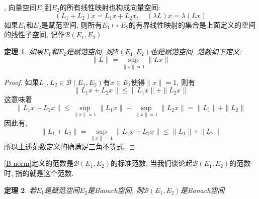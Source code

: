 \documentclass[a4paper,11pt]{book}
\newtheorem{theorem}{\hspace{2em}定理}[section]
\newtheorem{proof}{证明}[section]
\begin{document}
, 向量空间$E_1$到$E_2$的所有线性映射也构成向量空间:
\begin{equation*}
  (L_1+L_2)x=L_1x+L_2x,\quad (\lambda L)x=\lambda(Lx)
\end{equation*}
如果$E_1$和$E_2$是赋范空间, 则所有$E_1\mapsto E_2$的有界线性映射的集合是上面定义的空间的线性子空间, 记作$\mathcal{B}(E_1,E_2)$
\begin{theorem}
  如果$E_1$和$E_2$是赋范空间, 则$\mathcal{B}(E_1,E_2)$也是赋范空间, 范数如下定义:
  \begin{equation*}\label{B norm}
    \|L\|=\sup_{\|x\|=1}\|Lx\|
  \end{equation*}
\end{theorem}
\begin{proof}
  如果$L_1,L_2\in\mathcal{B}(E_1,E_2)$有$x\in E_1$使得$\|x\|=1$, 则有
  \begin{equation*}
    \|L_1x+L_2x\|\leq\|L_1x\|+\|L_2x\|
  \end{equation*}
  这意味着
  \begin{equation*}
    \|L_1x+L_2x\|\leq\sup_{\|x\|=1}\|L_1x\|+\sup_{\|x\|=1}\|L_2x\|=\|L_1\|+\|L_2\|
  \end{equation*}
  因此有,
  \begin{equation*}
    \|L_1+L_2\|=\sup_{\|x\|=1}\|L_1x+L_2x\|\leq\|L_1\|+\|L_2\|
  \end{equation*}
  所以上述范数定义的确满足三角不等式.
\end{proof}
\eqref{B norm}定义的范数是$\mathcal{B}(E_1,E_2)$的标准范数, 当我们谈论起$\mathcal{B}(E_1,E_2)$的范数时, 指的就是这个范数.
\begin{theorem}
  若$E_1$是赋范空间$E_2$是Banach空间, 则$\mathcal{B}(E_1,E_2)$是Banach空间
\end{theorem}
\end{document}
